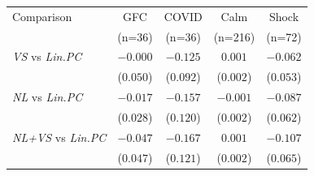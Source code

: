 \begin{tabular}{lcccc}
\toprule
Comparison & GFC & COVID & Calm & Shock \\
 & (n=36) & (n=36) & (n=216) & (n=72) \\
\midrule
\emph{VS} vs \emph{Lin.PC} & $-0.000$ & $-0.125$ & $0.001$ & $-0.062$ \\
 & \footnotesize($0.050$) & \footnotesize($0.092$) & \footnotesize($0.002$) & \footnotesize($0.053$) \\[4pt]
\emph{NL} vs \emph{Lin.PC} & $-0.017$ & $-0.157$ & $-0.001$ & $-0.087$ \\
 & \footnotesize($0.028$) & \footnotesize($0.120$) & \footnotesize($0.002$) & \footnotesize($0.062$) \\[4pt]
\emph{NL+VS} vs \emph{Lin.PC} & $-0.047$ & $-0.167$ & $0.001$ & $-0.107$ \\
 & \footnotesize($0.047$) & \footnotesize($0.121$) & \footnotesize($0.002$) & \footnotesize($0.065$) \\[4pt]
\bottomrule
\end{tabular}

